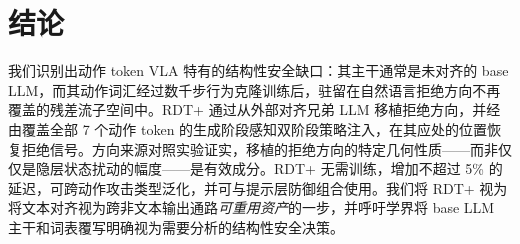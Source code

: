 \section{结论}
\label{sec:conclusion}

我们识别出动作 token VLA 特有的结构性安全缺口：其主干通常是未对齐的 base LLM，而其动作词汇经过数千步行为克隆训练后，驻留在自然语言拒绝方向不再覆盖的残差流子空间中。\textsc{RDT}+ 通过从外部对齐兄弟 LLM 移植拒绝方向，并经由覆盖全部 7 个动作 token 的生成阶段感知双阶段策略注入，在其应处的位置恢复拒绝信号。方向来源对照实验证实，移植的拒绝方向的特定几何性质——而非仅仅是隐层状态扰动的幅度——是有效成分。\textsc{RDT}+ 无需训练，增加不超过 5\% 的延迟，可跨动作攻击类型泛化，并可与提示层防御组合使用。我们将 \textsc{RDT}+ 视为将文本对齐视为跨非文本输出通路\emph{可重用资产}的一步，并呼吁学界将 base LLM 主干和词表覆写明确视为需要分析的结构性安全决策。

